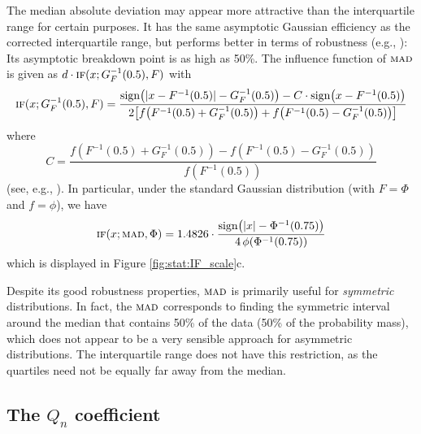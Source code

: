 The median absolute deviation may appear more attractive than the
interquartile range for certain purposes. It has the same asymptotic
Gaussian efficiency as the corrected interquartile range, but performs better
in terms of robustness (e.g., \citealp[p. 1273–1274]{rousseeuw:croux:1993}):
Its asymptotic breakdown point is as high as 50\%. The influence function 
of $\stsc{MAD}$ is given as $d \cdot \stsc{IF}(x; G_{F}^{-1}(0.5), F)$ with
\[
    \stsc{IF}(x; G_{F}^{-1}(0.5), F)
    = \frac{\sign\left(|x-F^{-1}(0.5)| - G_{F}^{-1}(0.5)\right) - C \cdot \sign\left(x-F^{-1}(0.5)\right)}
    {2 \left[f\left(F^{-1}(0.5) + G_{F}^{-1}(0.5)\right) + f\left(F^{-1}(0.5) - G_{F}^{-1}(0.5)\right)\right]}
\]
where
\[
    C = \frac{f\left(F^{-1}(0.5) + G_{F}^{-1}(0.5)\right) - f\left(F^{-1}(0.5) - G_{F}^{-1}(0.5)\right)}
    {f\left(F^{-1}(0.5)\right)}
\]
(see, e.g., \citealp{wilcox:2005}). In particular, under the standard Gaussian
distribution (with $F=\Phi$ and $f=\phi$), we have                              
\[
    \stsc{IF}(x; \stsc{MAD}, \Phi) 
    = 1.4826 \cdot\frac{\sign\left(|x| - \Phi^{-1}(0.75)\right)}
                       {4\,\phi\left(\Phi^{-1}(0.75)\right)}
\]
which is displayed in Figure \ref{fig:stat:IF_scale}c.                          


Despite its good robustness properties, $\stsc{MAD}$ is primarily useful for
\emph{symmetric} distributions. In fact, the $\stsc{MAD}$ corresponds to
finding the symmetric interval around the median that contains 50\% of the data
(50\% of the probability mass), which does not appear to be a very sensible
approach for asymmetric distributions. The interquartile range does not have
this restriction, as the quartiles need not be equally far away from the median.



\subsection{The $Q_n$ coefficient}

